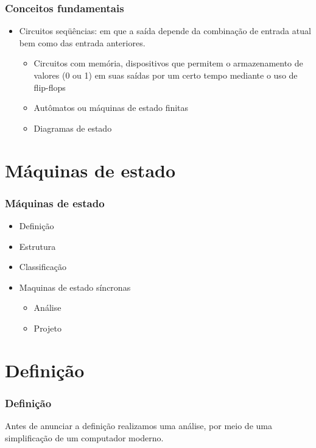 \documentclass{beamer}
\begin{document}
\begin{frame}
 \frametitle{Conceitos fundamentais}
 \begin{itemize}
  \item Circuitos seqüências: em que a saída depende da combinação de entrada atual bem como das entrada anteriores.
  \begin{itemize}
   \item Circuitos com memória, dispositivos que permitem o armazenamento de valores (0 ou 1) em suas saídas por um certo tempo mediante o uso de flip-flops
   \item Autômatos ou máquinas de estado finitas
   \item Diagramas de estado
  \end{itemize}
 \end{itemize}
\end{frame}

\section{Máquinas de estado}
\begin{frame}
 \frametitle{Máquinas de estado}
 \begin{itemize}
  \item Definição\pause
  \item Estrutura\pause
  \item Classificação\pause
  \item Maquinas de estado síncronas \pause
  \begin{itemize}
   \item Análise \pause
   \item Projeto 
  \end{itemize}
 \end{itemize}
\end{frame}

\section{Definição}
\begin{frame}
 \frametitle{Definição}
  Antes de anunciar a definição realizamos uma análise, por meio de uma simplificação de um computador moderno.
\end{frame}
\end{document}
